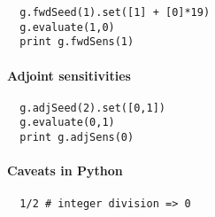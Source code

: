 \documentclass[a4paper,8pt,twocolumn]{article}
\begin{document}
\begin{verbatim}
  g.fwdSeed(1).set([1] + [0]*19)
  g.evaluate(1,0)
  print g.fwdSens(1)
\end{verbatim}

\paragraph{Adjoint sensitivities}

\begin{verbatim}
  g.adjSeed(2).set([0,1])
  g.evaluate(0,1)
  print g.adjSens(0)
\end{verbatim}

\paragraph{Caveats in Python}
\begin{verbatim}
  1/2 # integer division => 0
\end{verbatim}
\end{document}
